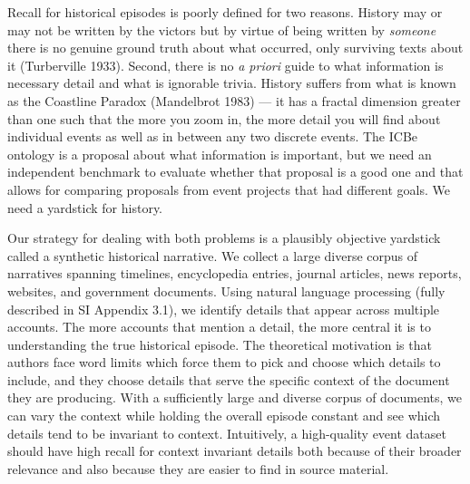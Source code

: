 \documentclass{article}
\begin{document}
Recall for historical episodes is poorly defined for two reasons.
History may or may not be written by the victors but by virtue of being
written by \emph{someone} there is no genuine ground truth about what
occurred, only surviving texts about it (Turberville 1933). Second,
there is no \emph{a priori} guide to what information is necessary
detail and what is ignorable trivia. History suffers from what is known
as the Coastline Paradox (Mandelbrot 1983) --- it has a fractal
dimension greater than one such that the more you zoom in, the more
detail you will find about individual events as well as in between any
two discrete events. The ICBe ontology is a proposal about what
information is important, but we need an independent benchmark to
evaluate whether that proposal is a good one and that allows for
comparing proposals from event projects that had different goals. We
need a yardstick for history.

Our strategy for dealing with both problems is a plausibly objective
yardstick called a synthetic historical narrative. We collect a large
diverse corpus of narratives spanning timelines, encyclopedia entries,
journal articles, news reports, websites, and government documents.
Using natural language processing (fully described in SI Appendix 3.1),
we identify details that appear across multiple accounts. The more
accounts that mention a detail, the more central it is to understanding
the true historical episode. The theoretical motivation is that authors
face word limits which force them to pick and choose which details to
include, and they choose details that serve the specific context of the
document they are producing. With a sufficiently large and diverse
corpus of documents, we can vary the context while holding the overall
episode constant and see which details tend to be invariant to context.
Intuitively, a high-quality event dataset should have high recall for
context invariant details both because of their broader relevance and
also because they are easier to find in source material.
\end{document}
